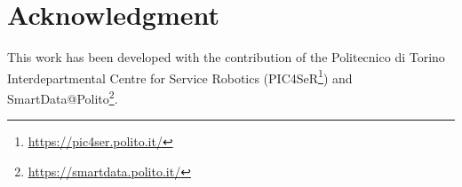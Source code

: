 \documentclass[journal]{IEEEtran}
\begin{document}

%




\section*{Acknowledgment}
This work has been developed with the contribution of the Politecnico di Torino Interdepartmental Centre for Service Robotics (PIC4SeR\footnote{\url{https://pic4ser.polito.it/}}) and SmartData@Polito\footnote{\url{https://smartdata.polito.it/}}.


\ifCLASSOPTIONcaptionsoff
  \newpage
\fi
\end{document}
